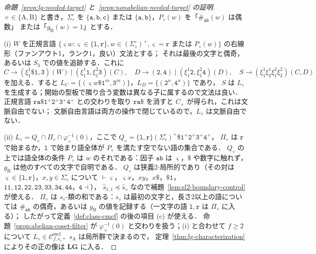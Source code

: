 \documentclass[11pt,a4paper]{ltjsarticle}
\numberwithin{equation}{section}
\theoremstyle{plain}
\theoremstyle{definition}
\theoremstyle{remark}
\newcommand{\Cmcf}[2]{\mathcal{C}^{\mathrm{mcf}}_{#1,#2}}
\theoremstyle{plain}
\begin{document}
\begin{proof}[命題~\ref{prop:lg-needed-target} と~\ref{prop:nonabelian-needed-target} の証明]
$\diamond\in\{\mathrm A,\mathrm B\}$ と書き，$\Sigma_\diamond^\circ$ を $\{\mathtt a,\mathtt b,\mathtt c\}$
または $\{\mathtt a,\mathtt b\}$，$P_\diamond(w)$ を「$\#_{\mathtt{ab}}(w)$ は偶数」
または「$g_{\mathrm B}(w)=1$」とする．

(i) $W$ を正規言語
$\{\varsigma w:\varsigma\in\{\mathtt l,\mathtt r\},w\in(\Sigma_\diamond^\circ)^+,
\varsigma=\mathtt r\text{ または }P_\diamond(w)\}$ の右線形（ファンアウト1，ランク1，良い）文法とする；
それは最後の文字と偶奇，あるいは $S_3$ での値を追跡する．これに
\[
 C\to(\xi_1^1\mathtt\$\mathtt 1,\mathtt 3)(W)\mid(\xi_1^1\mathtt 1,\xi_1^2\mathtt 3)(C),\quad
 D\to(\mathtt 2,\mathtt 4)\mid(\xi_1^1\mathtt 2,\xi_1^2\mathtt 4)(D),\quad
 S\to(\xi_1^1\xi_2^1\xi_1^2\xi_2^2)(C,D)
\]
を加える．すると $L_C=\{(\varsigma w\mathtt\$\mathtt 1^m,\mathtt 3^m)\}$，$L_D=\{(\mathtt 2^n,\mathtt 4^n)\}$ であり，
$S$ は $L_\diamond$ を生成する；開始の型板で隣り合う変数は異なる子に属するので文法は良い．
正規言語 $\mathtt{ra\$}\mathtt 1^+\mathtt 2^+\mathtt 3^+\mathtt 4^+$ との交わりを取り
$\mathtt{ra\$}$ を消すと $C_\times$ が得られ，これは文脈自由でない；
文脈自由言語は両方の操作で閉じているので，$L_\diamond$ は文脈自由でない．

(ii) $L_\diamond=Q_\diamond\cap\Pi_\diamond\cap\varphi_\times^{-1}(0)$，ここで
$Q_\diamond=\{\mathtt l,\mathtt r\}(\Sigma_\diamond^\circ)^+\mathtt\$\mathtt 1^+\mathtt 2^+\mathtt 3^+\mathtt 4^+$，
$\Pi_\diamond$ は $\mathtt r$ で始まるか，$\mathtt l$ で始まり語全体が $P_\diamond$ を満たす空でない語の集合である．
$Q_\diamond$ の上では語全体の条件 $P_\diamond$ は $w$ のそれである：因子 $\mathtt{ab}$ は
$\varsigma$，$\mathtt\$$ や数字に触れず，$g_{\mathrm B}$ は他のすべての文字で自明である．
$Q_\diamond$ は狭義2-局所的であり（その対は $\varsigma\in\{\mathtt l,\mathtt r\}$，$x,y\in\Sigma_\diamond^\circ$ について
$\vdash\varsigma$，$\varsigma x$，$xy$，$x\mathtt\$$，$\mathtt{\$1}$，
$\mathtt{11},\mathtt{12},\mathtt{22},\mathtt{23},\mathtt{33},\mathtt{34},\mathtt{44}$，$\mathtt 4\dashv$），
$\widehat s_{1,1}\preceq\widehat s_\diamond$ なので補題~\ref{lem:sl2-boundary-control} が使える．
$\Pi_\diamond$ は $s_\diamond$-類の和である：$s_\diamond$ は最初の文字と，長さ2以上の語については
$\#_{\mathtt{ab}}$ の偶奇，あるいは $g_{\mathrm B}$ の値を記録する（一文字の語 $\mathtt l,\mathtt r$ は $\Pi_\diamond$ に入る）；
したがって定義~\ref{def:class-cmcf} の後の項目 (c) が使える．
命題~\ref{prop:abelian-coset-filter} が $\varphi_\times^{-1}(0)$ と交わりを扱う；(i) と合わせて
$f\ge2$ について $L_\diamond\in\Cmcf{f}{s_\diamond}$．$s_{\mathrm A}$ は局所群で決まるので，
定理~\ref{thm:lg-characterization} によりその正の像は $\mathbf{LG}$ に入る．


\end{proof}
\end{document}
